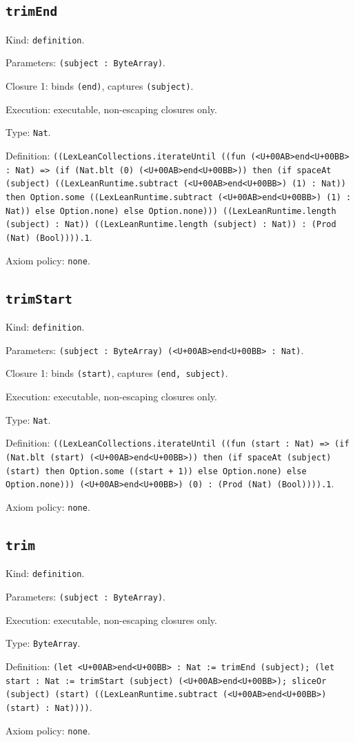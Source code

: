 \documentclass[11pt]{article}
\begin{document}
\subsection*{\texttt{trimEnd}}
\noindent Kind: \texttt{definition}.\par
\noindent Parameters: \texttt{(subject : ByteArray)}.\par
\noindent Closure 1: binds \texttt{(end)}, captures \texttt{(subject)}.\par
\noindent Execution: executable, non-escaping closures only.\par
\noindent Type: \texttt{Nat}.\par
\noindent Definition: \texttt{((LexLeanCollections.iterateUntil ((fun (<U+00AB>end<U+00BB> : Nat) => (if (Nat.blt (0) (<U+00AB>end<U+00BB>)) then (if spaceAt (subject) ((LexLeanRuntime.subtract (<U+00AB>end<U+00BB>) (1) : Nat)) then Option.some ((LexLeanRuntime.subtract (<U+00AB>end<U+00BB>) (1) : Nat)) else Option.none) else Option.none))) ((LexLeanRuntime.length (subject) : Nat)) ((LexLeanRuntime.length (subject) : Nat)) : (Prod (Nat) (Bool)))).1}.\par
\noindent Axiom policy: \texttt{none}.\par
\subsection*{\texttt{trimStart}}
\noindent Kind: \texttt{definition}.\par
\noindent Parameters: \texttt{(subject : ByteArray) (<U+00AB>end<U+00BB> : Nat)}.\par
\noindent Closure 1: binds \texttt{(start)}, captures \texttt{(end, subject)}.\par
\noindent Execution: executable, non-escaping closures only.\par
\noindent Type: \texttt{Nat}.\par
\noindent Definition: \texttt{((LexLeanCollections.iterateUntil ((fun (start : Nat) => (if (Nat.blt (start) (<U+00AB>end<U+00BB>)) then (if spaceAt (subject) (start) then Option.some ((start + 1)) else Option.none) else Option.none))) (<U+00AB>end<U+00BB>) (0) : (Prod (Nat) (Bool)))).1}.\par
\noindent Axiom policy: \texttt{none}.\par
\subsection*{\texttt{trim}}
\noindent Kind: \texttt{definition}.\par
\noindent Parameters: \texttt{(subject : ByteArray)}.\par
\noindent Execution: executable, non-escaping closures only.\par
\noindent Type: \texttt{ByteArray}.\par
\noindent Definition: \texttt{(let <U+00AB>end<U+00BB> : Nat := trimEnd (subject); (let start : Nat := trimStart (subject) (<U+00AB>end<U+00BB>); sliceOr (subject) (start) ((LexLeanRuntime.subtract (<U+00AB>end<U+00BB>) (start) : Nat))))}.\par
\noindent Axiom policy: \texttt{none}.\par
\end{document}
